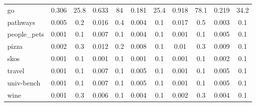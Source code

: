 {\begin{table*}[h]
\begin{tabular}{| l | c  c | c  c | c  c | c  c | c  c |}
go                          & 0.306 & 25.8 & 0.633 & 84  & 0.181 & 25.4  & 0.918 & 78.1 & 0.219 & 34.2  \\
pathways                    & 0.005 & 0.2  & 0.016 & 0.4 & 0.004 & 0.1   & 0.017 & 0.5  & 0.003 & 0.1   \\
people\_pets                & 0.001 & 0.1  & 0.007 & 0.1 & 0.004 & 0.1   & 0.001 & 0.1  & 0.005 & 0.1   \\
pizza                       & 0.002 & 0.3  & 0.012 & 0.2 & 0.008 & 0.1   & 0.01  & 0.3  & 0.009 & 0.1   \\
skos                        & 0.001 & 0.1  & 0.001 & 0.1 & 0.001 & 0.1   & 0.001 & 0.1  & 0.002 & 0.1   \\
travel                      & 0.001 & 0.1  & 0.007 & 0.1 & 0.005 & 0.1   & 0.001 & 0.1  & 0.005 & 0.1   \\
univ-bench                  & 0.001 & 0.1  & 0.007 & 0.1 & 0.005 & 0.1   & 0.001 & 0.1  & 0.005 & 0.1   \\
wine                        & 0.001 & 0.3  & 0.006 & 0.1 & 0.004 & 0.1   & 0.002 & 0.3  & 0.004 & 0.1  \\
    \hline
  \end{tabular}
\end{table*}
}